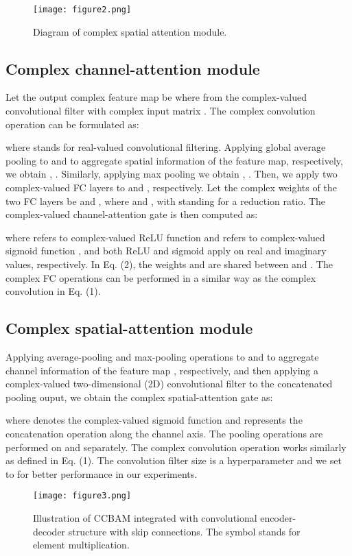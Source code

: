 \documentclass{article}
\begin{document}
\begin{figure}[t]
  \centering
  \texttt{[image: figure2.png]}
  \caption{Diagram of complex spatial attention module.}
  \label{fig1}
\end{figure}
\subsection{Complex channel-attention module}
Let the output complex feature map be  where  from the complex-valued convolutional filter  with complex input matrix . The complex convolution operation can be formulated as:

where  stands for real-valued convolutional filtering. Applying global average pooling to  and  to aggregate spatial information of the feature map, respectively, we obtain , . Similarly, applying max pooling we obtain , . Then, we apply two complex-valued FC layers to  and , respectively. Let the complex weights of the two FC layers be  and , where  and , with  standing for a reduction ratio. The complex-valued channel-attention gate  is then computed as:

where  refers to complex-valued ReLU function and  refers to complex-valued sigmoid function \cite{Trabelsi2018}, and both ReLU and sigmoid apply on real and imaginary values, respectively. In Eq. (2), the weights  and  are shared between  and . The complex FC operations can be performed in a similar way as the complex convolution in Eq. (1).

\subsection{Complex spatial-attention module}
Applying average-pooling and max-pooling operations to  and  to aggregate channel information of the feature map , respectively, and then applying a complex-valued two-dimensional (2D) convolutional filter  to the concatenated pooling ouput, we obtain the complex spatial-attention gate  as:

where  denotes the complex-valued sigmoid function and  represents the concatenation operation along the channel axis. The pooling operations are performed on  and  separately. The complex convolution operation works similarly as defined in Eq. (1). The convolution filter size is a hyperparameter and we set to  for better performance in our experiments.

\begin{figure}[t]
  \centering
  \texttt{[image: figure3.png]}
  \caption{Illustration of CCBAM integrated with convolutional encoder-decoder structure with skip connections. The symbol  stands for element multiplication.}
  \label{fig1}
\end{figure}
\end{document}
